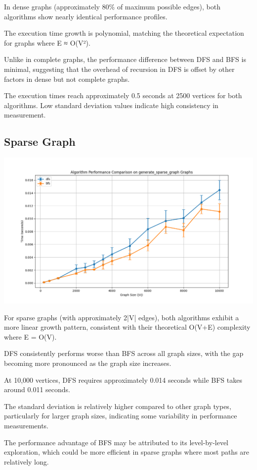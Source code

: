 \documentclass[a4paper,12pt]{article}
\begin{document}
In dense graphs (approximately 80\% of maximum possible edges), both algorithms show nearly identical performance profiles.

The execution time growth is polynomial, matching the theoretical expectation for graphs where E ≈ O(V²).

Unlike in complete graphs, the performance difference between DFS and BFS is minimal, suggesting that the overhead of recursion in DFS is offset by other factors in dense but not complete graphs.

The execution times reach approximately 0.5 seconds at 2500 vertices for both algorithms.
Low standard deviation values indicate high consistency in measurement.
\subsection{Sparse Graph}
\label{sec:org1658d8e}
\begin{center}
\includegraphics[width=.9\linewidth]{dfs_sparse.png}
\label{orgb0f7cab}
\end{center}

For sparse graphs (with approximately 2|V| edges), both algorithms exhibit a more linear growth pattern, consistent with their theoretical O(V+E) complexity where E = O(V).

DFS consistently performs worse than BFS across all graph sizes, with the gap becoming more pronounced as the graph size increases.

At 10,000 vertices, DFS requires approximately 0.014 seconds while BFS takes around 0.011 seconds.

The standard deviation is relatively higher compared to other graph types, particularly for larger graph sizes, indicating some variability in performance measurements.

The performance advantage of BFS may be attributed to its level-by-level exploration, which could be more efficient in sparse graphs where most paths are relatively long.
\end{document}
